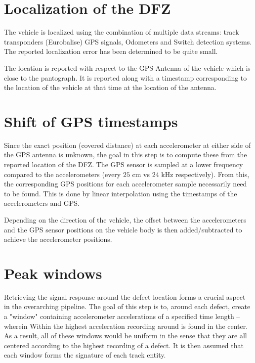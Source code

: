 
\section{Localization of the DFZ}

The vehicle is localized using the combination of multiple data streams: track transponders (Eurobalise) GPS signals, Odometers and Switch detection systems. The reported localization error has been determined to be quite small.

The location is reported with respect to the GPS Antenna of the vehicle which is close to the pantograph. It is reported along with a timestamp corresponding to the location of the vehicle at that time at the location of the antenna. 

\section{Shift of GPS timestamps}
Since the exact position (covered distance) at each accelerometer at either side of the GPS antenna is unknown, the goal in this step is to compute these from the reported location of the DFZ. The GPS sensor is sampled at a lower frequency compared to the accelerometers (every $25$ cm vs $24$ kHz respectively). From this, the corresponding GPS positions for each accelerometer sample necessarily need to be found. This is done by linear interpolation using the timestamps of the accelerometers and GPS. 

Depending on the direction of the vehicle, the offset between the accelerometers and the GPS sensor positions on the vehicle body is then added/subtracted to achieve the accelerometer positions.

\section{Peak windows}
Retrieving the signal response around the defect location forms a crucial aspect in the overarching pipeline. The goal of this step is to, around each defect, create a "window" containing accelerometer accelerations of a specified time length -- wherein Within the highest acceleration recording around is found in the center. As a result, all of these windows would be uniform in the sense that they are all centered according to the highest recording of a defect. It is then assumed that each window forms the signature of each track entity. 


